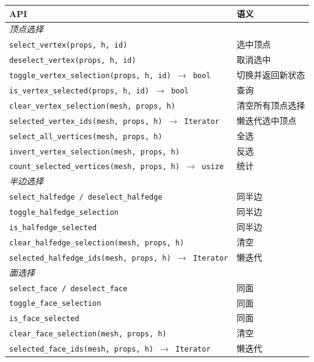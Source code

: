 \documentclass[11pt,a4paper]{article}
\begin{document}
\begin{longtable}{@{}ll@{}}
  \toprule
  \textbf{API} & \textbf{语义} \\
  \midrule
  \endhead
  \multicolumn{2}{l}{\textit{顶点选择}} \\
  \texttt{select\_vertex(props, h, id)}                       & 选中顶点 \\
  \texttt{deselect\_vertex(props, h, id)}                    & 取消选中 \\
  \texttt{toggle\_vertex\_selection(props, h, id) $\to$ bool} & 切换并返回新状态 \\
  \texttt{is\_vertex\_selected(props, h, id) $\to$ bool}     & 查询 \\
  \texttt{clear\_vertex\_selection(mesh, props, h)}          & 清空所有顶点选择 \\
  \texttt{selected\_vertex\_ids(mesh, props, h) $\to$ Iterator} & 懒迭代选中顶点 \\
  \texttt{select\_all\_vertices(mesh, props, h)}             & 全选 \\
  \texttt{invert\_vertex\_selection(mesh, props, h)}        & 反选 \\
  \texttt{count\_selected\_vertices(mesh, props, h) $\to$ usize} & 统计 \\
  \midrule
  \multicolumn{2}{l}{\textit{半边选择}} \\
  \texttt{select\_halfedge / deselect\_halfedge}             & 同半边 \\
  \texttt{toggle\_halfedge\_selection}                       & 同半边 \\
  \texttt{is\_halfedge\_selected}                            & 同半边 \\
  \texttt{clear\_halfedge\_selection(mesh, props, h)}        & 清空 \\
  \texttt{selected\_halfedge\_ids(mesh, props, h) $\to$ Iterator} & 懒迭代 \\
  \midrule
  \multicolumn{2}{l}{\textit{面选择}} \\
  \texttt{select\_face / deselect\_face}                     & 同面 \\
  \texttt{toggle\_face\_selection}                           & 同面 \\
  \texttt{is\_face\_selected}                                & 同面 \\
  \texttt{clear\_face\_selection(mesh, props, h)}           & 清空 \\
  \texttt{selected\_face\_ids(mesh, props, h) $\to$ Iterator} & 懒迭代 \\

\end{longtable}
\end{document}
